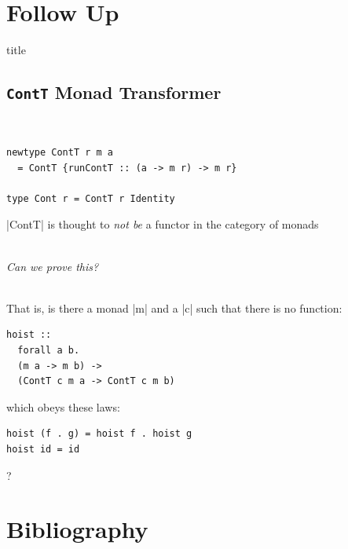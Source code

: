 \documentclass{beamer}
\begin{document}
\section{Follow Up}
\begin{frame}[plain]
  \vfill \centering
  \begin{beamercolorbox}[sep=8pt,center,shadow=true,rounded=true]{title}
    \insertsectionhead\par%
  \end{beamercolorbox}
  \vfill
\end{frame}

\subsection{\texttt{ContT} Monad Transformer}
\begin{frame}{\insertsectionhead\ \textemdash\
    \insertsubsectionhead}

\begin{lstlisting}
newtype ContT r m a
  = ContT {runContT :: (a -> m r) -> m r}

type Cont r = ContT r Identity
\end{lstlisting}

\framebreak

|ContT| is thought to \emph{not be} a functor in the category of monads\\~\\

\begin{center}
\emph{Can we prove this?}\\~\\
\end{center}

\framebreak

That is, is there a monad |m| and a |c| such that there is no function:

\begin{lstlisting}
hoist ::
  forall a b.
  (m a -> m b) ->
  (ContT c m a -> ContT c m b)
\end{lstlisting}

which obeys these laws:

\begin{lstlisting}
hoist (f . g) = hoist f . hoist g
hoist id = id
\end{lstlisting}

\begin{center}?\end{center}

\end{frame}


\section{Bibliography}
\begin{frame}{\insertsectionhead}
  
\end{frame}
\end{document}
